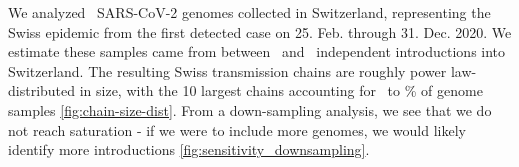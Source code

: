 \documentclass[9pt,twocolumn,twoside,lineno]{pnas-new}
\begin{document}
We analyzed \nfocalsamples\ SARS-CoV-2 genomes collected in Switzerland, representing the Swiss epidemic from the first detected case on 25. Feb. through 31. Dec. 2020. We estimate these samples came from between \nchainsmin\ and \nchainsmax\ independent introductions into Switzerland. The resulting Swiss transmission chains are roughly power law-distributed in size, with the 10 largest chains accounting for \maxlargestchainsper\ to \minlargestchainsper \% of genome samples \ref{fig:chain-size-dist}. From a down-sampling analysis, we see that we do not reach saturation - if we were to include more genomes, we would likely identify more introductions \ref{fig:sensitivity_downsampling}. 



\end{document}
